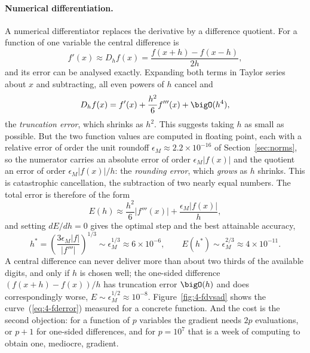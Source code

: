 \paragraph{Numerical differentiation.}
A numerical differentiator replaces the derivative by a difference quotient.  For a function of one
variable the central difference is
\begin{equation}
  f'(x) \approx D_h f(x) = \frac{f(x+h)-f(x-h)}{2h},
  \label{eq:4-centraldiff}
\end{equation}
and its error can be analysed exactly.  Expanding both terms in Taylor series
about $x$ and subtracting, all even powers of $h$ cancel and
\begin{equation}
  D_hf(x) = f'(x) + \frac{h^{2}}{6}f'''(x) + \bigO(h^{4}),
  \label{eq:4-truncation}
\end{equation}
the \emph{truncation error}, which shrinks as $h^{2}$.  This suggests taking
$h$ as small as possible.  But the two function values are computed in
floating point, each with a relative error of order the unit roundoff
$\epsilon_M\approx2.2\times10^{-16}$ of Section~\ref{sec:norms}, so the
numerator carries an absolute error of order $\epsilon_M|f(x)|$ and the
quotient an error of order $\epsilon_M|f(x)|/h$: the \emph{rounding error},
which \emph{grows} as $h$ shrinks.  This is catastrophic cancellation, the
subtraction of two nearly equal numbers.  The total error is therefore of the
form
\begin{equation}
  E(h) \approx \frac{h^{2}}{6}\left|f'''(x)\right|
             + \frac{\epsilon_M\left|f(x)\right|}{h},
  \label{eq:4-fderror}
\end{equation}
and setting $dE/dh=0$ gives the optimal step and the best attainable accuracy,
\begin{equation}
  h^{*} = \left(\frac{3\epsilon_M|f|}{|f'''|}\right)^{1/3}
        \sim \epsilon_M^{1/3}\approx 6\times10^{-6},
  \qquad
  E(h^{*}) \sim \epsilon_M^{2/3}\approx 4\times10^{-11}.
  \label{eq:4-fdoptimal}
\end{equation}
A central difference can never deliver more than about two thirds of the
available digits, and only if $h$ is chosen well; the one-sided difference
$(f(x+h)-f(x))/h$ has truncation error $\bigO(h)$ and does correspondingly
worse, $E\sim\epsilon_M^{1/2}\approx10^{-8}$.  Figure~\ref{fig:4-fdvsad}
shows the curve~(\ref{eq:4-fderror}) measured for a concrete function.  And
the cost is the second objection: for a function of $p$ variables the gradient
needs $2p$ evaluations, or $p+1$ for one-sided differences, and for $p=10^{7}$
that is a week of computing to obtain one, mediocre, gradient.

